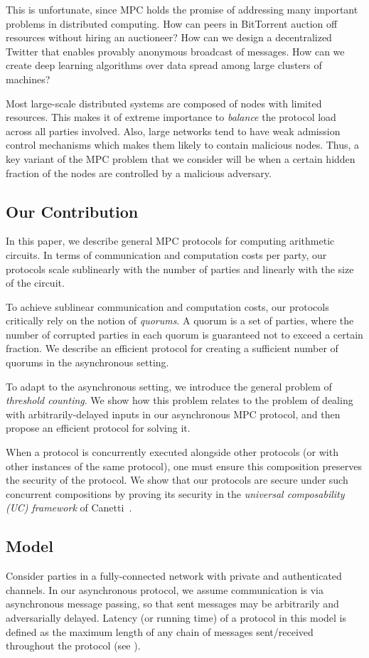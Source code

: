 \documentclass[11pt,letter]{article}
\theoremstyle{mytheoremstyle}
\begin{document}
This is unfortunate, since MPC holds the promise of addressing many important problems in distributed computing. How can peers in BitTorrent auction off resources without hiring an auctioneer? How can we design a decentralized Twitter that enables provably anonymous broadcast of messages. How can we create deep learning algorithms over data spread among large clusters of machines?

Most large-scale distributed systems are composed of nodes with limited resources. This makes it of extreme importance to \emph{balance} the protocol load across all parties involved. Also, large networks tend to have weak admission control mechanisms which makes them likely to contain malicious nodes. Thus, a key variant of the MPC problem that we consider will be when a certain hidden fraction of the nodes are controlled by a malicious adversary.

\subsection{Our Contribution} \label{sec:contribution}
In this paper, we describe general MPC protocols for computing arithmetic circuits. In terms of communication and computation costs per party, our protocols scale sublinearly with the number of parties and linearly with the size of the circuit. 

To achieve sublinear communication and computation costs, our protocols critically rely on the notion of \emph{quorums}. A quorum is a set of  parties, where the number of corrupted parties in each quorum is guaranteed not to exceed a certain fraction. We describe an efficient protocol for creating a sufficient number of quorums in the asynchronous setting.

To adapt to the asynchronous setting, we introduce the general problem of \emph{threshold counting}. We show how this problem relates to the problem of dealing with arbitrarily-delayed inputs in our asynchronous MPC protocol, and then propose an efficient protocol for solving it.

When a protocol is concurrently executed alongside other protocols (or with other instances of the same protocol), one must ensure this composition preserves the security of the protocol. We show that our protocols are secure under such concurrent compositions by proving its security in the \emph{universal composability (UC) framework} of Canetti~\cite{Canetti:UCSecurity:2001}.

\subsection{Model} \label{sec:model}
Consider  parties  in a fully-connected network with private and authenticated channels.
In our asynchronous protocol, we assume communication is via asynchronous message passing, so that sent messages may be arbitrarily and adversarially delayed. Latency (or running time) of a protocol in this model is defined as the maximum length of any chain of messages sent/received throughout the protocol (see \cite{CD,Attiya:DC:2004}).
\end{document}

